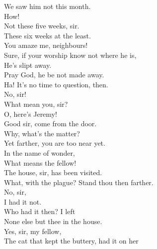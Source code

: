 \documentclass[a4paper,oneside,12pt]{memoir}
\begin{document}
\begin{drama*}
We saw him not this month.\\
\lovewitspeaks {} How!\\
\neighthreespeaks {} Not these five weeks, sir.\\
\neightwospeaks These six weeks at the least.\\
\lovewitspeaks {} You amaze me, neighbours!\\
\neighonespeaks Sure, if your worship know not where he is,\\
He's slipt away.\\
\neighthreespeaks {} Pray God, he be not made away.\\
\lovewitspeaks Ha! It's no time to question, then.\\
\neightwospeaks {} No, sir!\\
\facespeaks What mean you, sir?\\
\neighonespeaks
\neightwospeaks
\neighthreespeaks {}  O, here's Jeremy!\\
\facespeaks Good sir, come from the door.\\
\lovewitspeaks {} Why, what's the matter?\\
\facespeaks Yet farther, you are too near yet.\\
\lovewitspeaks {} In the name of wonder,\\
What means the fellow!\\
\facespeaks {} The house, sir, has been visited.\\
\lovewitspeaks What, with the plague? Stand thou then farther.\\
\facespeaks {} No, sir,\\
I had it not.\\
\lovewitspeaks {} Who had it then? I left\\
None else but thee in the house.\\
\facespeaks {} Yes, sir, my fellow,\\
The cat that kept the buttery, had it on her\\

\end{drama*}
\end{document}

